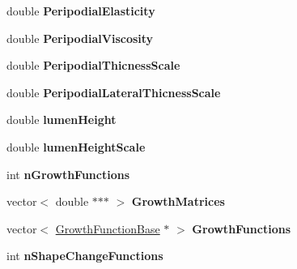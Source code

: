\begin{DoxyCompactItemize}
\item 
\hypertarget{classSimulation_a3d8435d5bedf3810cb12138538169d9c}{}double {\bfseries Peripodial\+Elasticity}\label{classSimulation_a3d8435d5bedf3810cb12138538169d9c}

\item 
\hypertarget{classSimulation_a53ed2b18ee5786cba3dde8d69a7f21df}{}double {\bfseries Peripodial\+Viscosity}\label{classSimulation_a53ed2b18ee5786cba3dde8d69a7f21df}

\item 
\hypertarget{classSimulation_a1b5fd33e66ce33ae07ba854785735162}{}double {\bfseries Peripodial\+Thicness\+Scale}\label{classSimulation_a1b5fd33e66ce33ae07ba854785735162}

\item 
\hypertarget{classSimulation_a1614132f37b02b184661370a188d9b74}{}double {\bfseries Peripodial\+Lateral\+Thicness\+Scale}\label{classSimulation_a1614132f37b02b184661370a188d9b74}

\item 
\hypertarget{classSimulation_a661531b9180d4b893f4f0221fe518b7b}{}double {\bfseries lumen\+Height}\label{classSimulation_a661531b9180d4b893f4f0221fe518b7b}

\item 
\hypertarget{classSimulation_a1a4bdb2cb7810665b95bd884dfa19adc}{}double {\bfseries lumen\+Height\+Scale}\label{classSimulation_a1a4bdb2cb7810665b95bd884dfa19adc}

\item 
\hypertarget{classSimulation_a47187b5d7f450b1c41e6fdaffeedc207}{}int {\bfseries n\+Growth\+Functions}\label{classSimulation_a47187b5d7f450b1c41e6fdaffeedc207}

\item 
\hypertarget{classSimulation_a8cdab34c42a949aeeaa2b76fe5cf7d76}{}vector$<$ double $\ast$$\ast$$\ast$ $>$ {\bfseries Growth\+Matrices}\label{classSimulation_a8cdab34c42a949aeeaa2b76fe5cf7d76}

\item 
\hypertarget{classSimulation_a88e857983b0152e32b969dfd3ed72fdc}{}vector$<$ \hyperlink{classGrowthFunctionBase}{Growth\+Function\+Base} $\ast$ $>$ {\bfseries Growth\+Functions}\label{classSimulation_a88e857983b0152e32b969dfd3ed72fdc}

\item 
\hypertarget{classSimulation_a74251252e9f320268055537749d674c1}{}int {\bfseries n\+Shape\+Change\+Functions}\label{classSimulation_a74251252e9f320268055537749d674c1}


\end{DoxyCompactItemize}
